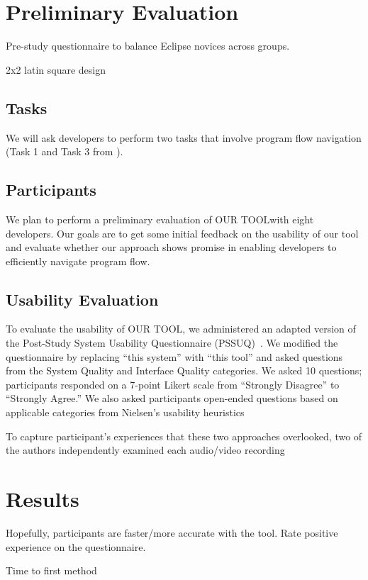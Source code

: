 \documentclass[conference]{IEEEtran}
\newcommand{\toolName}{OUR TOOL}
\begin{document}
\section{Preliminary Evaluation}

Pre-study questionnaire to balance Eclipse novices across groups.

2x2 latin square design


\subsection{Tasks}
We will ask developers to perform two tasks that involve program flow navigation (Task 1 and Task 3 from \cite{Smith2015}).

\subsection{Participants}
We plan to perform a preliminary evaluation of \toolName with eight developers.
Our goals are to get some initial feedback on the usability of our tool and evaluate whether our approach shows promise in enabling developers to efficiently navigate program flow. 

\subsection{Usability Evaluation}
To evaluate the usability of \toolName, we administered an adapted version of the Post-Study System Usability Questionnaire (PSSUQ)~\cite{Lewis95ibmcomputer}. We modified the questionnaire by replacing ``this system'' with ``this tool'' and asked questions from the System Quality and Interface Quality categories. We asked 10 questions; participants responded on a 7-point Likert scale from ``Strongly Disagree'' to ``Strongly Agree.'' 	
We also asked participants open-ended questions based on applicable categories from Nielsen's usability heuristics~\cite{Nielsen1992}

To capture participant's experiences that these two approaches overlooked, two of the authors independently examined each audio/video recording 

\section{Results}
Hopefully, participants are faster/more accurate with the tool. Rate positive experience on the questionnaire.

Time to first method
\end{document}

